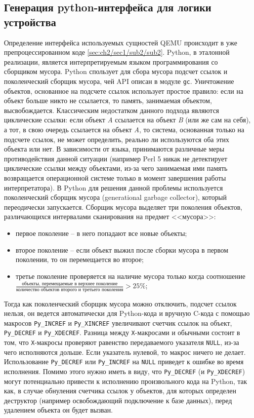 \subsection{Генерация python-интерфейса для логики устройства}\label{sec:ch2/sec1/sub3}

Определение интерфейса используемых сущностей QEMU происходит в уже препроцессированном коде \ref{sec:ch2/sec1/sub2/sub2}.
Python, в эталонной реализации, является интерпретируемым языком программирования со сборщиком мусора.
Python спользует для сбора мусора подсчет ссылок и поколенческий сборщик мусора, чей API описан в модуле \texttt{gc}.
Уничтожение объектов, основанное на подсчете ссылок использует простое правило: если на объект больше
никто не ссылается, то память, занимаемая объектом, высвобождается.
Классическим недостатком данного подхода являются циклические ссылки: если объект \textit{A} ссылается
на объект \textit{B} (или же сам на себя), а тот, в свою очередь ссылается на объект \textit{A}, то система, основанная
только на подсчете ссылок, не может определить, реально ли используются оба этих объекта или нет.
В зависимости от языка, принимаются различные меры противодействия данной ситуации
(например Perl 5 никак не детектирует циклические ссылки между объектами,
из-за чего занимаемая ими память возвращается операционной системе только в момент завершения
работы интерпретатора).
В Python для решения данной проблемы используется поколенческий сборщик мусора (generational garbage collector),
который переодически запускается. Сборщик мусора выделяет три поколения объектов,
различающихся интервалами сканирования на предмет <<мусора>>:
\begin{itemize}
    \item первое поколение -- в него попадают все новые объекты;
    \item второе поколение -- если объект выжил после сборки мусора
        в первом поколении, то он перемещается во второе;
    \item третье поколение проверяется на наличие мусора только когда
        соотношение $\frac{\text{объекты, перемещаемые в верхнее поколение}}{\text{количество объектов второго и третьего поколения}} > 25\%$;
\end{itemize}

Тогда как поколенческий сборщик мусора можно отключить, подсчет ссылок нельзя, он ведется автоматически
для Python-кода и вручную C-кода с помощью макросов \texttt{Py\_INCREF} и \texttt{Py\_XINCREF}
увеличивают счетчик ссылок на объект, \texttt{Py\_DECREF} и \texttt{Py\_XDECREF}.
Разница между \texttt{X}-макросами и обычными состоит в том, что \texttt{X}-макросы
проверяют равенство передаваемого указателя \texttt{NULL}, из-за чего исполняются дольше.
Если указатель нулевой, то макрос ничего не делает.
Использование \texttt{Py\_DECREF} или \texttt{Py\_INCREF} на \texttt{NULL} приведет к ошибке во время исполнения.
Помимо этого нужно иметь в виду, что \texttt{Py\_DECREF} (и \texttt{Py\_XDECREF}) могут потенциально
привести к исполнению произвольного кода на Python, так как, в случае обнуления счетчика
ссылок у объектов, для которых определен деструктор (например освобождающий подключение к базе данных),
перед удалением объекта он будет вызван.


